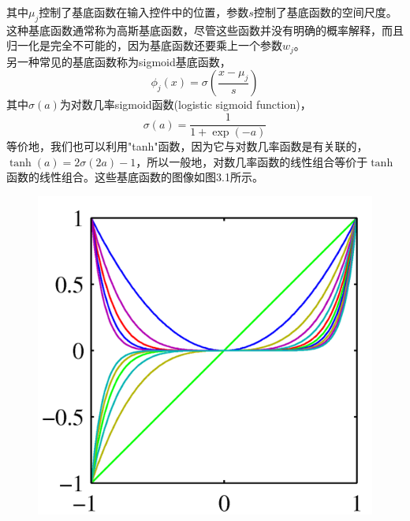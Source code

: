 \documentclass[b5paper]{book}
\numberwithin{equation}{chapter}
\begin{document}
{	其中$\mu_j$控制了基底函数在输入控件中的位置，参数$s$控制了基底函数的空间尺度。这种基底函数通常称为高斯基底函数，尽管这些函数并没有明确的概率解释，而且归一化是完全不可能的，因为基底函数还要乘上一个参数$w_j$。\\
	\indent 另一种常见的基底函数称为sigmoid基底函数，
	\begin{equation}
		\phi_j(x)=\sigma\left(\frac{x-\mu_j}{s}\right)
	\end{equation}
	其中$\sigma(a)$为对数几率sigmoid函数(logistic sigmoid function)，
	\begin{equation}
		\sigma(a)=\frac{1}{1+\exp(-a)}
	\end{equation}
	等价地，我们也可以利用"tanh"函数，因为它与对数几率函数是有关联的，$\tanh (a) = 2\sigma(2a)-1$，所以一般地，对数几率函数的线性组合等价于$\tanh$函数的线性组合。这些基底函数的图像如图3.1所示。
	\begin{figure}[ht]
	\centering
		\begin{minipage}[t]{0.3\linewidth}
		\centering
		\includegraphics[scale=0.8]{Images/3-1a.png}
		\label{fig:3-1a}
		\end{minipage}
		\begin{minipage}[t]{0.3\linewidth}
		\centering

\end{minipage}
\end{figure}}
\end{document}

